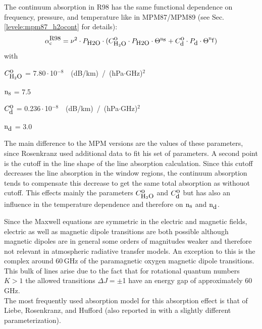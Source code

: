 \label{levele:pwr98_h2ocont}
The continuum absorption in R98 has the same functional dependence on frequency,
pressure, and temperature like in MPM87/MPM89 (see Sec. \ref{levele:mpm87_h2ocont}
for details):
\begin{equation} 
  \label{eq:pwr98:abscont}
  \alpha^{\mbox{\rm \small R98}}_{\rm c} = \nu^2 \cdot P_{\mbox{\rm \small H2O}} \cdot 
               (C^{\mbox{\rm o}}_{\mbox{\rm \small H}_{2}\mbox{\rm \small O}} \cdot P_{\mbox{\rm \small H2O}} \cdot \Theta^{{\rm n}_{\mbox{\rm \small s}}} + 
                C^{\mbox{\rm o}}_{\mbox{\rm \small d}} \cdot P_{\mbox{\rm \small d}}  \cdot \Theta^{{\rm n}_{\mbox{\rm \small f}}})
\end{equation}
with
\begin{description}
\item{$C^{\mbox{\rm o}}_{\mbox{\rm \small H}_{2}\mbox{\rm \small O}}$}   = 7.80\,$\cdot$\,10$^{-8}$~~(dB/km)~/~(hPa$\cdot$GHz)$^2$
\item{${\rm n}_{\mbox{\rm \small s}}$}    = 7.5
\item{$C^{\mbox{\rm o}}_{\mbox{\rm \small d}}$}   =  0.236\,$\cdot$\,10$^{-8}$~~(dB/km)~/~(hPa$\cdot$GHz)$^2$
\item{${\rm n}_{\mbox{\rm \small d}}$}    = 3.0
\end{description}
The main difference to the MPM versions are the values of these 
parameters, since Rosenkranz used additional data to fit his set of 
parameters. A second point is the cutoff in the line shape of the line 
absorption calculation. Since this cutoff decreases the line absorption 
in the window regions, the continuum absorption tends to compensate this 
decrease to get the same total absorption as withouot cutoff. This effects 
mainly the parameters $C^{\mbox{\rm o}}_{\mbox{\rm \small H}_{2}\mbox{\rm \small O}}$ and $C^{\mbox{\rm o}}_{\mbox{\rm \small d}}$ but has also an influence in the 
temperature dependence and therefore on ${\rm n}_{\mbox{\rm \small s}}$ and ${\rm n}_{\mbox{\rm \small d}}$.




\label{levelc:02_models}
%
Since the Maxwell equations are symmetric in the electric and
magnetic fields, electric as well as magnetic dipole transitions 
are both possible although magnetic dipoles are in general some
orders of magnitudes weaker and therefore not relevant in
atmospheric radiative transfer models. An exception to this is the complex 
around 60\,GHz of the paramagnetic oxygen magnetic dipole transitions. 
This bulk of lines arise due to the fact that for rotational 
quantum numbers $K>1$ the allowed transitions \mbox{$\Delta J = \pm$1} 
have an energy gap of approximately 60\,GHz.\\
The most frequently used absorption model for this absorption effect is that of
Liebe, Rosenkranz, and Hufford \cite{liebeetal:92} (also reported in 
\cite{pwr:93} with a slightly different parameterization).

